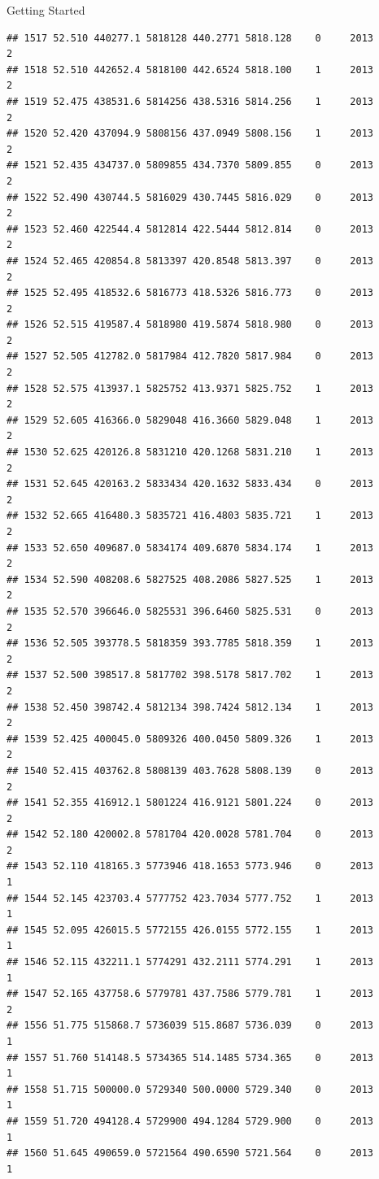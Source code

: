 \documentclass[
  ignorenonframetext,
]{beamer}
\begin{document}
\begin{frame}[fragile]{Getting Started}
\begin{verbatim}
## 1517 52.510 440277.1 5818128 440.2771 5818.128    0     2013        2
## 1518 52.510 442652.4 5818100 442.6524 5818.100    1     2013        2
## 1519 52.475 438531.6 5814256 438.5316 5814.256    1     2013        2
## 1520 52.420 437094.9 5808156 437.0949 5808.156    1     2013        2
## 1521 52.435 434737.0 5809855 434.7370 5809.855    0     2013        2
## 1522 52.490 430744.5 5816029 430.7445 5816.029    0     2013        2
## 1523 52.460 422544.4 5812814 422.5444 5812.814    0     2013        2
## 1524 52.465 420854.8 5813397 420.8548 5813.397    0     2013        2
## 1525 52.495 418532.6 5816773 418.5326 5816.773    0     2013        2
## 1526 52.515 419587.4 5818980 419.5874 5818.980    0     2013        2
## 1527 52.505 412782.0 5817984 412.7820 5817.984    0     2013        2
## 1528 52.575 413937.1 5825752 413.9371 5825.752    1     2013        2
## 1529 52.605 416366.0 5829048 416.3660 5829.048    1     2013        2
## 1530 52.625 420126.8 5831210 420.1268 5831.210    1     2013        2
## 1531 52.645 420163.2 5833434 420.1632 5833.434    0     2013        2
## 1532 52.665 416480.3 5835721 416.4803 5835.721    1     2013        2
## 1533 52.650 409687.0 5834174 409.6870 5834.174    1     2013        2
## 1534 52.590 408208.6 5827525 408.2086 5827.525    1     2013        2
## 1535 52.570 396646.0 5825531 396.6460 5825.531    0     2013        2
## 1536 52.505 393778.5 5818359 393.7785 5818.359    1     2013        2
## 1537 52.500 398517.8 5817702 398.5178 5817.702    1     2013        2
## 1538 52.450 398742.4 5812134 398.7424 5812.134    1     2013        2
## 1539 52.425 400045.0 5809326 400.0450 5809.326    1     2013        2
## 1540 52.415 403762.8 5808139 403.7628 5808.139    0     2013        2
## 1541 52.355 416912.1 5801224 416.9121 5801.224    0     2013        2
## 1542 52.180 420002.8 5781704 420.0028 5781.704    0     2013        2
## 1543 52.110 418165.3 5773946 418.1653 5773.946    0     2013        1
## 1544 52.145 423703.4 5777752 423.7034 5777.752    1     2013        1
## 1545 52.095 426015.5 5772155 426.0155 5772.155    1     2013        1
## 1546 52.115 432211.1 5774291 432.2111 5774.291    1     2013        1
## 1547 52.165 437758.6 5779781 437.7586 5779.781    1     2013        2
## 1556 51.775 515868.7 5736039 515.8687 5736.039    0     2013        1
## 1557 51.760 514148.5 5734365 514.1485 5734.365    0     2013        1
## 1558 51.715 500000.0 5729340 500.0000 5729.340    0     2013        1
## 1559 51.720 494128.4 5729900 494.1284 5729.900    0     2013        1
## 1560 51.645 490659.0 5721564 490.6590 5721.564    0     2013        1

\end{verbatim}
\end{frame}
\end{document}
